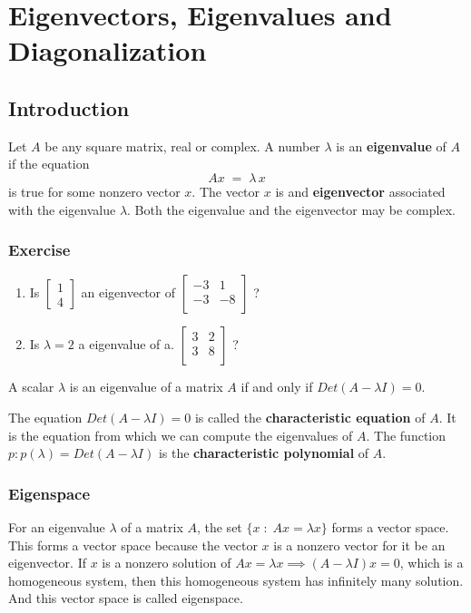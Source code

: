 \documentclass[aima104_lecturenotes_ku.tex]{subfiles}
\begin{document}
\chapter{Eigenvectors, Eigenvalues and Diagonalization}
\section{Introduction}
Let $A$ be any square matrix, real or complex. A number $\lambda$ is an \textbf{eigenvalue} of $A$ if the equation $$Ax\; = \; \lambda\,x$$
is true for some nonzero vector $x$. The vector $x$ is and \textbf{eigenvector} associated with the eigenvalue $\lambda$. Both the eigenvalue and the eigenvector may be complex.

\subsection{Exercise}
\begin{enumerate}
\item Is $
  \begin{bmatrix}
    1 \\ 4
  \end{bmatrix}$ an eigenvector of $\begin{bmatrix} -3 & 1  \\  -3 & -8  \\ \end{bmatrix}$ ?
\item Is $\lambda =2$ a eigenvalue of
  a. $\begin{bmatrix}
    3 & 2  \\
    3 & 8  \\
  \end{bmatrix}$ ?
\end{enumerate}

\begin{mdframed}

  \begin{theorem}
    A scalar $\lambda$ is an eigenvalue of a matrix $A$ if and only if $Det(A-\lambda I)=0$.
  \end{theorem}
  The equation $Det(A-\lambda I)=0$ is called the \textbf{characteristic equation} of $A$. It is the equation from which we can compute the eigenvalues of $A$. The function \\ $p: p(\lambda) = Det(A-\lambda I)$ is the \textbf{characteristic polynomial} of $A$.

\end{mdframed}

\subsection{Eigenspace}
For an eigenvalue $\lambda$ of a matrix $A$, the set $\{x\; : \; Ax=\lambda x\}$ forms a vector space. This forms a vector space because the vector \(x\) is a nonzero vector for it be an eigenvector. If \(x\) is a nonzero solution of \(Ax=\lambda x \implies (A-\lambda I)x=0\), which is a homogeneous system, then this homogeneous system has infinitely many solution. And this vector space is called  eigenspace.
\end{document}
